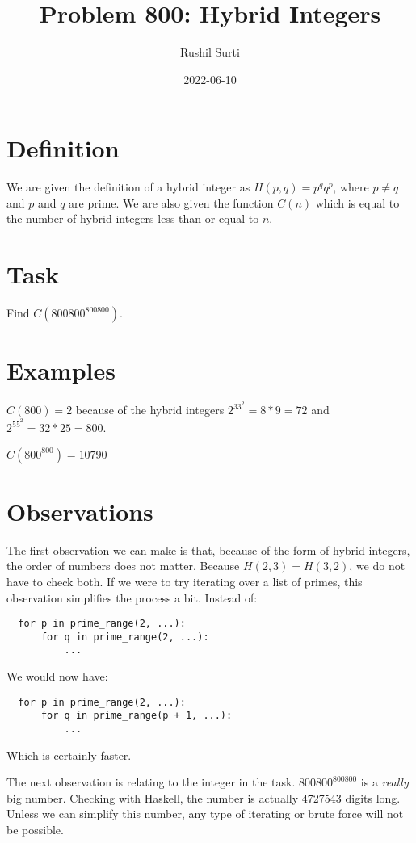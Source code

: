 \documentclass[13pt]{article}
\title{Problem 800: Hybrid Integers}
\date{2022-06-10}
\author{Rushil Surti}
\begin{document}
\maketitle

\section{Definition}

We are given the definition of a hybrid integer as $H(p, q) = p^qq^p$, where $p \neq q$ and $p$ and $q$ are prime. We are also given the function $C(n)$ which is equal to the number of hybrid integers less than or equal to $n$.

\section{Task}

Find $C(800800^{800800})$.

\section{Examples}

$C(800) = 2$ because of the hybrid integers $2^33^2 = 8 * 9 = 72$ and $2^55^2 = 32 * 25 = 800$.

$C(800^{800}) = 10790$

\section{Observations}

The first observation we can make is that, because of the form of hybrid integers, the order of numbers does not matter. Because $H(2, 3) = H(3, 2)$, we do not have to check both. If we were to try iterating over a list of primes, this observation simplifies the process a bit. Instead of:

\begin{verbatim}
  for p in prime_range(2, ...):
      for q in prime_range(2, ...):
          ...
\end{verbatim}

We would now have:

\begin{verbatim}
  for p in prime_range(2, ...):
      for q in prime_range(p + 1, ...):
          ...
\end{verbatim}

Which is certainly faster.

The next observation is relating to the integer in the task. $800800^{800800}$ is a \textit{really} big number. Checking with Haskell, the number is actually 4727543 digits long. Unless we can simplify this number, any type of iterating or brute force will not be possible.
\end{document}
